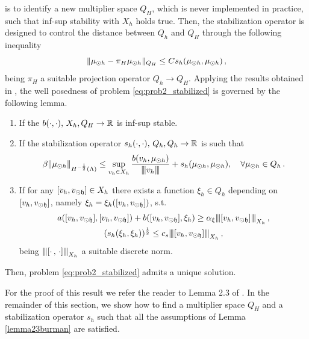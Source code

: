 \documentclass[r]{siamart171218}
\begin{document}
is to identify a new multiplier space $Q_H$, which is never implemented in practice, such that inf-sup stability with $X_h$ holds true. Then, the stabilization operator is designed to control the distance between $Q_h$ and $Q_H$ through the following inequality
\begin{equation*}
    \|\mu_{\odot h} - \pi_H \mu_{\odot h}\|_{Q_H} \leq C s_h(\mu_{\odot h}, \mu_{\odot h})\,,
\end{equation*}
being $\pi_H$ a suitable projection operator $Q_h \rightarrow Q_H$. Applying the results obtained in \cite{burman2014}, the well posedness of problem \eqref{eq:prob2_stabilized} is governed by the following lemma.
\begin{lemma}\label{lemma23burman}
\begin{enumerate}
    \item If the $b(\cdot,\cdot),\, X_h,Q_H \rightarrow \mathbb{R}$ is inf-sup stable.
    \item If the stabilization operator $s_h(\cdot,\cdot),\, Q_h,Q_h \rightarrow \mathbb{R}$ is such that
    \begin{equation*}
        \beta \|\mu_{\odot h}\|_{H^{-\frac12}(\Lambda)} \leq \sup\limits_{v_h \in X_h} \frac{b(v_h,\mu_{\odot h})}{{\left\vert\kern-0.25ex\left\vert\kern-0.25ex\left\vert v_h \right\vert\kern-0.25ex\right\vert\kern-0.25ex\right\vert}} + s_h(\mu_{\odot h}, \mu_{\odot h}), \quad \forall \mu_{\odot h} \in Q_h\,.
    \end{equation*}
    \item If for any $[v_h, v_{\odot \mathfrak{h}}] \in X_h$ there exists a function $\xi_h\in Q_h$ depending on $[v_h, v_{\odot \mathfrak{h}}]$, namely $\xi_h=\xi_h([v_h, v_{\odot \mathfrak{h}}])$, s.t.
\begin{gather}
\label{stab_coercivity}
a([v_h, \vdfh],[v_h, \vdfh] ) + b([v_h, \vdfh], \xi_h) \geq \alpha_\xi \vertiii{[v_h, \vdfh]}_{X_h}\,,
\\
\label{stab_stability}
(s_h(\xi_{h}, \xi_{h}))^{\frac 12} \leq c_s \vertiii{[v_h, \vdfh]}_{X_h}\,,
\end{gather}
being ${\left\vert\kern-0.25ex\left\vert\kern-0.25ex\left\vert [\cdot \, ,\, \cdot]  \right\vert\kern-0.25ex\right\vert\kern-0.25ex\right\vert}_{X_h}$ a suitable discrete norm. 
\end{enumerate}
Then, problem \eqref{eq:prob2_stabilized} admits a unique solution.
\end{lemma}
For the proof of this result we refer the reader to Lemma 2.3 of \cite{burman2014}. In the remainder of this section, we show how to find a multiplier space $Q_H$ and a stabilization operator $s_h$ such that all the assumptions of Lemma \ref{lemma23burman} are satisfied.
\end{document}
